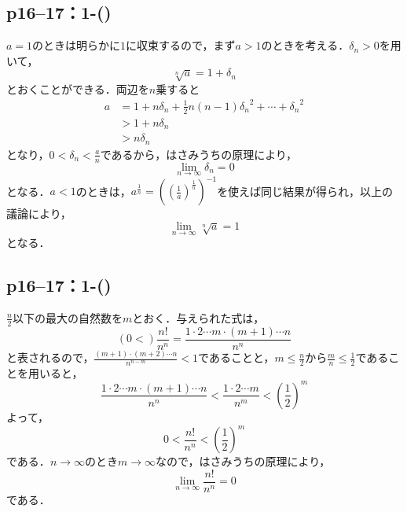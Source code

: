 \subsection*{p16--17：1-()}

\begin{tleftbar}
    $a=1$のときは明らかに$1$に収束するので，まず$a>1$のときを考える．$\delta_n >0$を用いて，
    \[
        \sqrt[n]{a} =1+\delta_n
    \]
    とおくことができる．両辺を$n$乗すると
    \begin{align*}
        a & = 1+ n \delta_n + \frac{1}{2}n(n-1) {\delta_n}^2 + \cdots + {\delta_n}^2 \\
          & >1+n \delta_n                                                            \\
          & >n \delta_n
    \end{align*}
    となり，$0<\delta_n <\frac{a}{n}$であるから，はさみうちの原理により，
    \[
        \lim_{n \to \infty} \delta_n =0
    \]
    となる．$a<1$のときは，$a^{\frac{1}{n}}=\left(\left(\frac{1}{a}\right)^{\frac{1}{n}}\right)^{-1}$を使えば同じ結果が得られ，以上の議論により，
    \[
        \lim_{n \to \infty} \sqrt[n]{a} =1
    \]
    となる．
\end{tleftbar}

\subsection*{p16--17：1-()}

\begin{tleftbar}
    $\frac{n}{2}$以下の最大の自然数を$m$とおく．与えられた式は，
    \[
        \left( 0  < \right) \frac{n!}{n^n}  = \frac{1 \cdot 2 \dotsm m \cdot (m+1) \dotsm n}{n^n}
    \]
    と表されるので，$\frac{(m+1) \cdot (m+2) \dotsm n}{n^{n-m}} <1$であることと，$m \le \frac{n}{2}$から$\frac{m}{n} \le \frac{1}{2}$であることを用いると，
    \[
        \frac{1 \cdot 2 \dotsm m \cdot (m+1) \dotsm n}{n^n} < \frac{1 \cdot 2 \dotsm m}{n^m} <\left(\frac{1}{2}\right)^m
    \]
    よって，
    \[
        0 < \frac{n!}{n^n} <\left(\frac{1}{2}\right)^m
    \]
    である．$n \to \infty$のとき$m \to \infty$なので，はさみうちの原理により，
    \[
        \lim_{n \to \infty}\frac{n!}{n^n} =0
    \]
    である．
\end{tleftbar}
